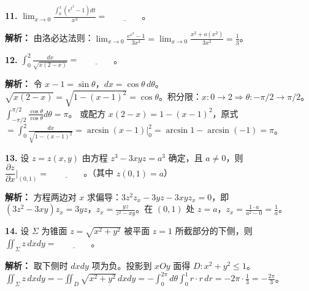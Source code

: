 \textbf{11.} $\displaystyle\lim_{x\to0}\frac{\int_0^x(e^{t^2}-1)dt}{x^3} = \underline{\qquad\qquad}$。

\ifshowsolutions\par\noindent\textbf{解析：} 由洛必达法则：$\lim_{x\to0}\frac{e^{x^2}-1}{3x^2} = \lim_{x\to0}\frac{x^2+o(x^2)}{3x^2} = \frac{1}{3}$。\else \answerarea \fi

\vspace{8pt}

\textbf{12.} $\displaystyle\int_{0}^{2} \frac{dx}{\sqrt{x(2-x)}} = \underline{\qquad\qquad}$。

\ifshowsolutions\par\noindent\textbf{解析：} 令 $x-1=\sin\theta$，$dx=\cos\theta\,d\theta$。$\sqrt{x(2-x)}=\sqrt{1-(x-1)^2}=\cos\theta$。积分限：$x:0\to2 \Rightarrow \theta:-\pi/2\to\pi/2$。$\int_{-\pi/2}^{\pi/2}\frac{\cos\theta}{\cos\theta}d\theta = \pi$。
或配方 $x(2-x)=1-(x-1)^2$，原式 $=\int_0^2\frac{dx}{\sqrt{1-(x-1)^2}} = \arcsin(x-1)\big|_0^2 = \arcsin1-\arcsin(-1)=\pi$。\else \answerarea \fi

\vspace{8pt}

\textbf{13.} 设 $z=z(x,y)$ 由方程 $z^3-3xyz=a^3$ 确定，且 $a\neq0$，则 $\dfrac{\partial z}{\partial x}\Big|_{(0,1)} = \underline{\qquad\qquad}$。（其中 $z(0,1)=a$）

\ifshowsolutions\par\noindent\textbf{解析：} 方程两边对 $x$ 求偏导：$3z^2 z_x - 3yz - 3xy z_x = 0$，即 $(3z^2-3xy)z_x = 3yz$，$z_x = \frac{yz}{z^2-xy}$。在 $(0,1)$ 处 $z=a$，$z_x = \frac{1\cdot a}{a^2-0} = \frac{1}{a}$。
\else \answerarea \fi

\vspace{8pt}

\textbf{14.} 设 $\Sigma$ 为锥面 $z=\sqrt{x^2+y^2}$ 被平面 $z=1$ 所截部分的下侧，则 $\displaystyle\iint_{\Sigma} z\,dxdy = \underline{\qquad\qquad}$。

\ifshowsolutions\par\noindent\textbf{解析：} 取下侧时 $dxdy$ 项为负。投影到 $xOy$ 面得 $D: x^2+y^2\leqslant1$。$\iint_{\Sigma} z\,dxdy = -\iint_{D} \sqrt{x^2+y^2}\,dxdy = -\int_0^{2\pi}d\theta\int_0^1 r\cdot r\,dr = -2\pi\cdot\frac{1}{3} = -\frac{2\pi}{3}$。
\else \answerarea \fi

\vspace{8pt}

